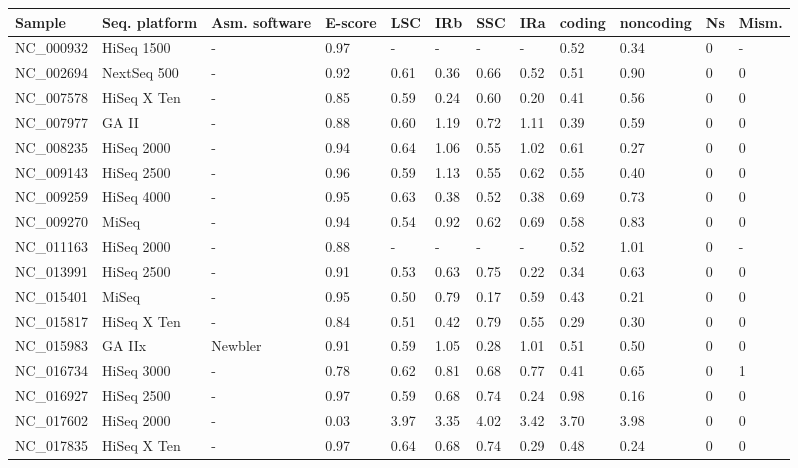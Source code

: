 \begin{table}[ht]
\centering
\begin{tabular}{llllllllllll}
  \hline
Sample & Seq. platform & Asm. software & E-score & LSC & IRb & SSC & IRa & coding & noncoding & Ns & Mism. \\ 
  \hline
NC\_000932 & HiSeq 1500 & - & 0.97 & - & - & - & - & 0.52 & 0.34 &   0 & - \\ 
  NC\_002694 & NextSeq 500 & - & 0.92 & 0.61 & 0.36 & 0.66 & 0.52 & 0.51 & 0.90 &   0 &     0 \\ 
  NC\_007578 & HiSeq X Ten & - & 0.85 & 0.59 & 0.24 & 0.60 & 0.20 & 0.41 & 0.56 &   0 &     0 \\ 
  NC\_007977 & GA II & - & 0.88 & 0.60 & 1.19 & 0.72 & 1.11 & 0.39 & 0.59 &   0 &     0 \\ 
  NC\_008235 & HiSeq 2000 & - & 0.94 & 0.64 & 1.06 & 0.55 & 1.02 & 0.61 & 0.27 &   0 &     0 \\ 
  NC\_009143 & HiSeq 2500 & - & 0.96 & 0.59 & 1.13 & 0.55 & 0.62 & 0.55 & 0.40 &   0 &     0 \\ 
  NC\_009259 & HiSeq 4000 & - & 0.95 & 0.63 & 0.38 & 0.52 & 0.38 & 0.69 & 0.73 &   0 &     0 \\ 
  NC\_009270 & MiSeq & - & 0.94 & 0.54 & 0.92 & 0.62 & 0.69 & 0.58 & 0.83 &   0 &     0 \\ 
  NC\_011163 & HiSeq 2000 & - & 0.88 & - & - & - & - & 0.52 & 1.01 &   0 & - \\ 
  NC\_013991 & HiSeq 2500 & - & 0.91 & 0.53 & 0.63 & 0.75 & 0.22 & 0.34 & 0.63 &   0 &     0 \\ 
  NC\_015401 & MiSeq & - & 0.95 & 0.50 & 0.79 & 0.17 & 0.59 & 0.43 & 0.21 &   0 &     0 \\ 
  NC\_015817 & HiSeq X Ten & - & 0.84 & 0.51 & 0.42 & 0.79 & 0.55 & 0.29 & 0.30 &   0 &     0 \\ 
  NC\_015983 & GA IIx & Newbler & 0.91 & 0.59 & 1.05 & 0.28 & 1.01 & 0.51 & 0.50 &   0 &     0 \\ 
  NC\_016734 & HiSeq 3000 & - & 0.78 & 0.62 & 0.81 & 0.68 & 0.77 & 0.41 & 0.65 &   0 &     1 \\ 
  NC\_016927 & HiSeq 2500 & - & 0.97 & 0.59 & 0.68 & 0.74 & 0.24 & 0.98 & 0.16 &   0 &     0 \\ 
  NC\_017602 & HiSeq 2000 & - & 0.03 & 3.97 & 3.35 & 4.02 & 3.42 & 3.70 & 3.98 &   0 &     0 \\ 
  NC\_017835 & HiSeq X Ten & - & 0.97 & 0.64 & 0.68 & 0.74 & 0.29 & 0.48 & 0.24 &   0 &     0 \\ 

\end{tabular}
\end{table}
